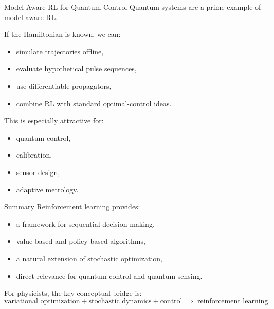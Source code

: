\documentclass[aspectratio=169]{beamer}
\begin{document}
\begin{frame}{Model-Aware RL for Quantum Control}
  Quantum systems are a prime example of model-aware RL.

  If the Hamiltonian is known, we can:
  \begin{itemize}
  \item simulate trajectories offline,
  \item evaluate hypothetical pulse sequences,
  \item use differentiable propagators,
  \item combine RL with standard optimal-control ideas.
  \end{itemize}

  This is especially attractive for:
  \begin{itemize}
  \item quantum control,
  \item calibration,
  \item sensor design,
  \item adaptive metrology.
  \end{itemize}
\end{frame}

\begin{frame}{Summary}
  Reinforcement learning provides:
  \begin{itemize}
  \item a framework for sequential decision making,
  \item value-based and policy-based algorithms,
  \item a natural extension of stochastic optimization,
  \item direct relevance for quantum control and quantum sensing.
  \end{itemize}

  For physicists, the key conceptual bridge is:
  \[
  \text{variational optimization} + \text{stochastic dynamics} + \text{control}
  \;\Rightarrow\; \text{reinforcement learning}.
  \]
\end{frame}

\end{document}
